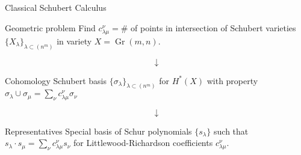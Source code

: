 \documentclass{beamer}
\DeclareMathOperator{\Gr}{Gr}
\newcommand{\cupprod}{\cup}
\begin{document}
\begin{frame}{Classical Schubert Calculus}
    \begin{block}{Geometric problem}
    Find \(c_{\lambda \mu}^\nu = \#\) of points in
    intersection of Schubert varieties \(\{X_\lambda\}_{\lambda
      \subset (n^m)}\) in variety \(X = \Gr(m,n)\). \pause
  \end{block}
  \vspace{-0.1in}
  \[
    \downarrow
  \]
  \vspace{-0.1in}
  \begin{block}{Cohomology}
    Schubert basis \(\{\sigma_\lambda\}_{\lambda \subset (n^m)}\) for \(H^*(X)\) with property \(\sigma_\lambda \cupprod \sigma_\mu = \sum_\nu c_{\lambda \mu}^\nu \sigma_\nu\) %
  \end{block}\pause
\vspace{-0.1in}  
\[
  \downarrow
\]
\vspace{-0.1in}
\begin{block}{Representatives}
  Special basis of Schur polynomials \(\{s_\lambda\}\) such that
  \(s_\lambda \cdot s_\mu = \sum_\nu c_{\lambda \mu}^\nu s_\nu\) for
  Littlewood-Richardson coefficients \(c_{\lambda \mu}^\nu\).
\end{block}
\end{frame}
\end{document}
